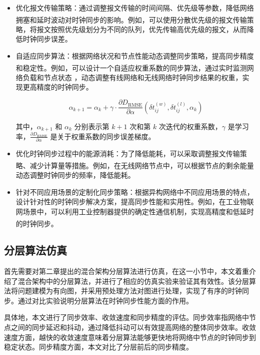 \documentclass[UTF8,a4paper,12pt]{ctexart}
\numberwithin{equation}{section}
\begin{document}
\begin{itemize}
	\item 优化报文传输策略：通过调整报文传输的时间间隔、优先级等参数，降低网络拥塞和延时波动对时钟同步的影响\textsuperscript{\cite{mizrahi2012slave}}。例如，可以使用分散优先级的报文传输策略，将报文按照优先级划分为不同的队列，优先传输高优先级的报文，从而降低时钟同步误差。
	\item 自适应同步算法：根据网络状况和节点性能动态调整同步策略，提高同步精度和稳定性\textsuperscript{\cite{fradkov1997adaptive}}。例如，可以设计一个自适应权重系数的同步算法，通过实时监测网络负载和节点状态
	，动态调整有线网络和无线网络时钟同步结果的权重，实现更高精度的时钟同步。
	
	\begin{equation}
		\alpha_{k+1} = \alpha_k + \gamma \cdot \frac{\partial D_\text{RMSE}}{\partial \alpha} (\delta t_{ij}^{(w)}, \delta t_{ij}^{(l)}, \alpha_k)
	\end{equation}
	
	其中，$\alpha_{k+1}$ 和 $\alpha_k$ 分别表示第 $k+1$ 次和第 $k$ 次迭代的权重系数，$\gamma$ 是学习率，$\frac{\partial D_\text{RMSE}}{\partial \alpha}$ 是关于权重系数的同步误差梯度。
	
	\item 优化时钟同步过程中的能源消耗：为了降低能耗，可以采取调整报文传输策略、减少计算量等措施\textsuperscript{\cite{xue2021wicsync}}。例如，在无线网络节点中，可以根据节点的剩余能量动态调整时钟同步的频率，降低能耗。
	
	\item 针对不同应用场景的定制化同步策略：根据异构网络中不同应用场景的特点，设计针对性的时钟同步解决方案，提高同步性能和实用性。例如，在工业物联网场景中，可以利用工业控制器提供的确定性通信机制，实现高精度和低延时的时钟同步\textsuperscript{\cite{gangakhedkar2018use}}。
	
\end{itemize}

\subsection{分层算法仿真}

首先需要对第二章提出的混合架构分层算法进行仿真，在这一小节中，本文着重介绍了混合架构中的分层算法，并进行了相应的仿真实验来验证其有效性。该分层算法将问题建模为有向图，并采用预处理方法对图进行处理，实现了有序的时钟同步。通过对比实验说明分层算法在时钟同步性能方面的作用。

具体地，本文进行了同步效率、收敛速度和同步精度的评估。同步效率指网络中节点之间的同步延迟和抖动，通过降低抖动可以有效提高网络的整体同步效率。收敛速度方面，越快的收敛速度意味着分层算法能够更快地将网络中节点的时钟同步到稳定状态。同步精度方面，本文对比了分层前后的同步精度。
\end{document}
